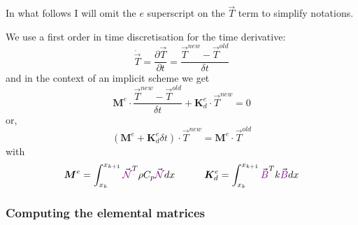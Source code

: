 In what follows I will omit the $e$ superscript on the $\vec{T}$ term to simplify notations. 

We use a first order in time discretisation for the time derivative:
\[
\dot{\vec T}= \frac{\partial {\vec T}}{\partial t} = \frac{{\vec T}^{new}-{\vec T}^{old}}{\delta t}
\]
and in the context of an implicit scheme we get
\[
{\bm M}^e \cdot \frac{{\vec T}^{new}-{\vec T}^{old}}{\delta t} + {\bm K}_d^e \cdot {\vec T}^{new} = 0
\]
or, 
\[
\boxed{
( {\bm M}^e +  {\bm K}_d^e  \delta t ) \cdot {\vec T}^{new} =  {\bm M}^e \cdot  {\vec T}^{old}
}
\]
with 
\[
{\bm M}^e=  \int_{x_k}^{x_{k+1}}   {\vec {\color{violet}{\mathcal{N}}}}^T \rho C_p {\vec {\color{violet}{\mathcal{N}}}} dx  
\quad\quad\quad
{\bm K}_d^e =
 \int_{x_k}^{x_{k+1}}   {\vec {\color{violet}B}}^T k {\vec {\color{violet}B}} dx 
\]

\subsubsection{Computing the elemental matrices}


